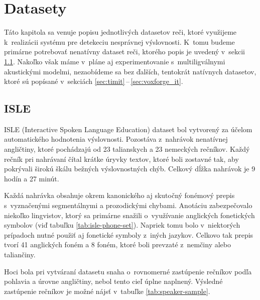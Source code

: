 \chapter{Datasety} \label{cha:datasets}

Táto kapitola sa venuje popisu jednotlivých datasetov reči, ktoré využijeme k~realizácii systému pre detekeciu nesprávnej výslovnosti. K~tomu budeme primárne potrebovať nenatívny dataset reči, ktorého popis je uvedený v~sekcii \ref{sec:isle}. Nakoľko však máme v~pláne aj experimentovanie s~multiligválnymi akustickými modelmi, nezaobídeme sa bez ďalších, tentokrát natívnych datasetov, ktoré sú popísané v~sekciách \ref{sec:timit}\,--\,\ref{sec:voxforge_it}.

\section{ISLE} \label{sec:isle}

ISLE (Interactive Spoken Language Education) dataset \cite{ISLE} bol vytvorený za účelom automatického hodnotenia výslovnosti. Pozostáva z~nahrávok nenatívnej angličtiny, ktoré pochádzajú od 23 talianskych a 23 nemeckých rečníkov. Každý rečník pri nahrávaní čítal krátke úryvky textov, ktoré boli zostavné tak, aby pokrývali širokú škálu bežných výslovnostných chýb. Celkový dĺžka nahrávok je 9 hodín a 27 minút.

Každá nahrávka obsahuje okrem kanonického aj skutočný fonémový prepis s~vyznačenými segmentálnymi a prozodickými chybami. Anotáciu zabezpečovalo niekoľko lingvistov, ktorý sa primárne snažili o~využívanie anglických fonetických symbolov (viď tabuľku \ref{tab:isle-phone-set}). Napriek tomu bolo v~niektorých prípadoch nutné použiť aj fonetické symboly z~iných jazykov. Celkovo tak prepis tvorí 41 anglických foném a 8 foném, ktoré boli prevzaté z~nemčiny alebo taliančiny. 

Hoci bola pri vytváraní datasetu snaha o~rovnomerné zastúpenie rečníkov podľa pohlavia a úrovne angličtiny, nebol tento cieľ úplne naplnený. Výsledné zastúpenie rečníkov je možné nájsť v~tabuľke \ref{tab:speaker-sample}.

